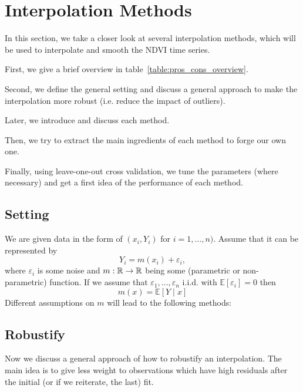 \newcommand{\RobItPlot}{fitted to different (SCL45) NDVI time series. Iterations of a robustifing refit (as indicated in section~\ref{sec:loess_robustify}) are also displayed}


\chapter{Interpolation Methods}

In this section, we take a closer look at several interpolation methods, which will be used to interpolate and smooth the NDVI time series.

First, we give a brief overview in table~\ref{table:pros_cons_overview}.

Second, we define the general setting and discuss a general approach to make the interpolation more robust (i.e. reduce the impact of outliers).

Later, we introduce and discuss each method.

Then, we try to extract the main ingredients of each method to forge our own one.

Finally, using leave-one-out cross validation, we tune the parameters (where necessary) and get a first idea of the performance of each method.


\footnotesize

\normalsize


\section{Setting}
We are given data in the form of $\left(x_{i}, Y_{i}\right)$ for $i=1, \ldots, n)$. Assume that it can be represented by
$$
	Y_{i}=m\left(x_{i}\right)+\varepsilon_{i},
$$
where $\varepsilon_i$ is some noise and $m: \mathbb{R} \rightarrow \mathbb{R}$ being some (parametric or non-parametric) function. If we assume that $\varepsilon_{1}, \ldots, \varepsilon_{n}$ i.i.d. with $\mathbb{E}\left[\varepsilon_{i}\right]=0$ then $$m(x)=\mathbb{E}[Y \mid x]$$
Different assumptions on $m$ will lead to the following methods:

\section{Robustify}
\label{sec:loess_robustify}
Now we discuss a general approach of how to robustify an interpolation. The main idea is to give less weight to observations which have high residuals after the initial (or if we reiterate, the last) fit.

